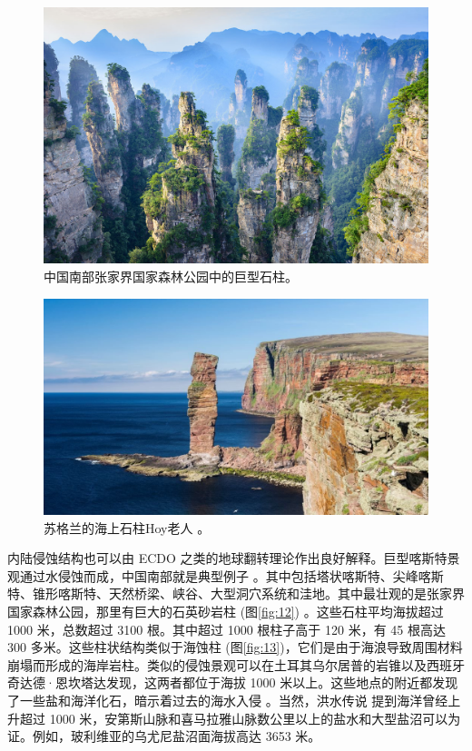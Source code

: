 \documentclass[10pt,twocolumn,letterpaper]{article}
\begin{document}
\begin{figure}[b]
\begin{center}
   \includegraphics[width=1\linewidth]{zhangjiajie.jpg}
\end{center}
   \caption{中国南部张家界国家森林公园中的巨型石柱。}
\label{fig:12}
\label{fig:onecol}
\end{figure}

\begin{figure}[b]
\begin{center}
   \includegraphics[width=1\linewidth]{hoy.jpg}
\end{center}
   \caption{苏格兰的海上石柱Hoy老人 \cite{83}。}
\label{fig:13}
\label{fig:onecol}
\end{figure}

内陆侵蚀结构也可以由 ECDO 之类的地球翻转理论作出良好解释。巨型喀斯特景观通过水侵蚀而成，中国南部就是典型例子 \cite{82}。其中包括塔状喀斯特、尖峰喀斯特、锥形喀斯特、天然桥梁、峡谷、大型洞穴系统和洼地。其中最壮观的是张家界国家森林公园，那里有巨大的石英砂岩柱 (图\ref{fig:12}) \cite{84}。这些石柱平均海拔超过 1000 米，总数超过 3100 根。其中超过 1000 根柱子高于 120 米，有 45 根高达 300 多米\cite{85}。这些柱状结构类似于海蚀柱 (图\ref{fig:13})，它们是由于海浪导致周围材料崩塌而形成的海岸岩柱。类似的侵蚀景观可以在土耳其乌尔居普的岩锥以及西班牙奇达德·恩坎塔达发现，这两者都位于海拔 1000 米以上。这些地点的附近都发现了一些盐和海洋化石，暗示着过去的海水入侵 \cite{15,86,87}。当然，洪水传说 \cite{3} 提到海洋曾经上升超过 1000 米，安第斯山脉和喜马拉雅山脉数公里以上的盐水和大型盐沼可以为证。例如，玻利维亚的乌尤尼盐沼面海拔高达 3653 米\cite{94}。
\end{document}
